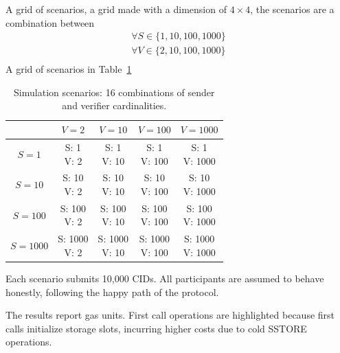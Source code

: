 A grid of scenarios, a grid made with a dimension of $4\times 4$, the scenarios are a combination between
\begin{gather*}
    \forall S \in \{1, 10, 100, 1000\}\\
    \forall V \in \{2, 10, 100, 1000\}\\
\end{gather*}
A grid of scenarios in Table~\ref{tab:proto-evaluation-scenario-grid}
\begin{table}
    \centering
    \begin{tabular}{|c|c|c|c|c|}
        \hline
        & $V = 2$ & $V = 10$ & $V = 100$ & $V = 1000$ \\
        \hline
        $S = 1$ & \shortstack{S: 1\\V: 2} & \shortstack{S: 1\\V: 10} & \shortstack{S: 1\\V: 100} & \shortstack{S: 1\\V: 1000} \\
        \hline
        $S = 10$ & \shortstack{S: 10\\V: 2} & \shortstack{S: 10\\V: 10} & \shortstack{S: 10\\V: 100} & \shortstack{S: 10\\V: 1000} \\
        \hline
        $S = 100$ & \shortstack{S: 100\\V: 2} & \shortstack{S: 100\\V: 10} & \shortstack{S: 100\\V: 100} & \shortstack{S: 100\\V: 1000} \\
        \hline
        $S = 1000$ & \shortstack{S: 1000\\V: 2} & \shortstack{S: 1000\\V: 10} & \shortstack{S: 1000\\V: 100} & \shortstack{S: 1000\\V: 1000} \\
        \hline
    \end{tabular}
    \caption{Simulation scenarios: 16 combinations of sender and verifier cardinalities.}
    \label{tab:proto-evaluation-scenario-grid}
\end{table}

Each scenario submits 10,000 CIDs. All participants are assumed to behave honestly, following the happy path of the protocol.

The results report gas units.
First call operations are highlighted because first calls initialize storage slots, incurring higher costs due to cold SSTORE operations.

